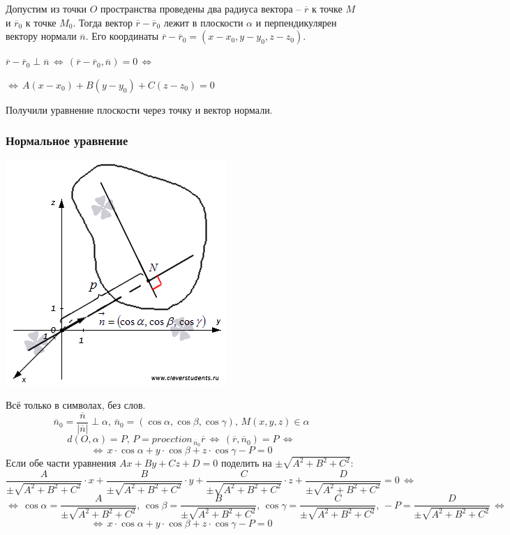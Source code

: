 \documentclass{article}
\begin{document}
Допустим из точки $O$ пространства проведены два радиуса вектора -- $\overline{r}$ к точке $M$ и $\overline{r}_0$ к точке $M_0$. Тогда вектор $\overline{r}-\overline{r}_0$ лежит в плоскости $\alpha$ и перпендикулярен вектору нормали $\overline{n}$. Его координаты $\overline{r}-\overline{r}_0=(x-x_0,y-y_0,z-z_0)$.

$\overline{r}-\overline{r}_0\perp \overline{n}\,\Leftrightarrow\,(\overline{r}-\overline{r}_0,\overline{n})=0\,\Leftrightarrow\,$

$\Leftrightarrow\, A(x-x_0)+B(y-y_0)+C(z-z_0)=0 $

Получили уравнение плоскости через точку и вектор нормали.

\newpage
\subsubsection{Нормальное уравнение}
\begin{center}
    \includegraphics[scale=0.6]{pic4.png}
\end{center}
Всё только в символах, без слов.
$$ \overline{n}_0=\frac{\overline{n}}{|\overline{n}|}\perp \alpha,\,\overline{n}_0=(\cos\alpha,\cos\beta,\cos\gamma),\, M(x,y,z)\in\alpha$$
$$d(O,\alpha) = P,\,P=proection_{\,\overline{n}_0}\overline{r}\,\Leftrightarrow\,(\overline{r},\overline{n}_0)=P\,\Leftrightarrow$$
$$ \Leftrightarrow\,x\cdot\cos\alpha+y\cdot\cos\beta+z\cdot\cos\gamma-P=0 $$
Если обе части уравнения $Ax+By+Cz+D=0$ поделить на $\pm\sqrt{A^2+B^2+C^2}$:
$$ \frac{A}{\pm\sqrt{A^2+B^2+C^2}}\cdot x+\frac{B}{\pm\sqrt{A^2+B^2+C^2}}\cdot y+\frac{C}{\pm\sqrt{A^2+B^2+C^2}}\cdot z +\frac{D}{\pm\sqrt{A^2+B^2+C^2}}=0 \,\Leftrightarrow$$
$$ \Leftrightarrow\,\cos\alpha=\frac{A}{\pm\sqrt{A^2+B^2+C^2}},\,\cos\beta=\frac{B}{\pm\sqrt{A^2+B^2+C^2}},\,\cos\gamma=\frac{C}{\pm\sqrt{A^2+B^2+C^2}},\,-P=\frac{D}{\pm\sqrt{A^2+B^2+C^2}}\,\Leftrightarrow $$
$$ \Leftrightarrow\,x\cdot\cos\alpha+y\cdot\cos\beta+z\cdot\cos\gamma-P=0$$
\newpage
\end{document}
